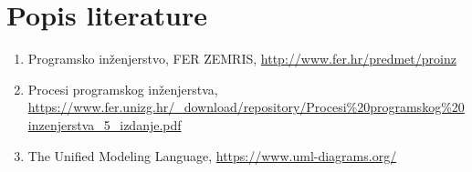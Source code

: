 \chapter*{Popis literature}
	 	
	
		
		
		\begin{enumerate}
			
			
			\item  Programsko inženjerstvo, FER ZEMRIS, \url{http://www.fer.hr/predmet/proinz}
			\item  Procesi programskog inženjerstva, \url{https://www.fer.unizg.hr/_download/repository/Procesi%20programskog%20inzenjerstva_5_izdanje.pdf}
			\item  The Unified Modeling Language, \url{https://www.uml-diagrams.org/}
			
			
			
			
			
		\end{enumerate}
		
		 